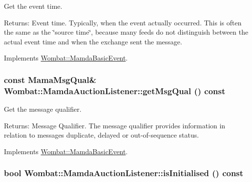 Get the event time. 

\begin{Desc}
\item[Returns:]Event time. Typically, when the event actually occurred. This is often the same as the \char`\"{}source time\char`\"{}, because many feeds do not distinguish between the actual event time and when the exchange sent the message. \end{Desc}


Implements \hyperlink{classWombat_1_1MamdaBasicEvent_7285491c2c657207a64b1b0449c0339b}{Wombat::Mamda\-Basic\-Event}.\hypertarget{classWombat_1_1MamdaAuctionListener_6bb4128d50574f643efa39dc8edcd9cc}{
\subsubsection[getMsgQual]{\setlength{\rightskip}{0pt plus 5cm}const Mama\-Msg\-Qual\& Wombat::Mamda\-Auction\-Listener::get\-Msg\-Qual () const}}
\label{classWombat_1_1MamdaAuctionListener_6bb4128d50574f643efa39dc8edcd9cc}


Get the message qualifier. 

\begin{Desc}
\item[Returns:]Message Qualifier. The message qualifier provides information in relation to messages duplicate, delayed or out-of-sequence status. \end{Desc}


Implements \hyperlink{classWombat_1_1MamdaBasicEvent_675ce8f1de581548426335423d6b3864}{Wombat::Mamda\-Basic\-Event}.\hypertarget{classWombat_1_1MamdaAuctionListener_a6c080b83b8b26d2cbc5f95d3800076f}{
\subsubsection[isInitialised]{\setlength{\rightskip}{0pt plus 5cm}bool Wombat::Mamda\-Auction\-Listener::is\-Initialised () const}}
\label{classWombat_1_1MamdaAuctionListener_a6c080b83b8b26d2cbc5f95d3800076f}


